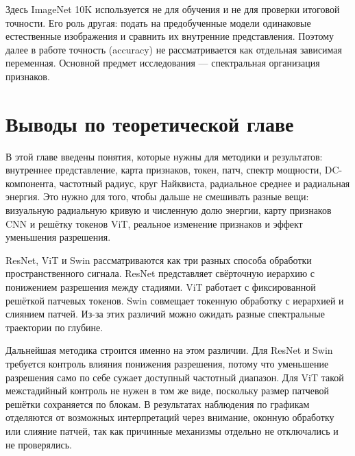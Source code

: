 Здесь ImageNet 10K используется не для обучения и не для проверки итоговой точности. Его роль другая: подать на предобученные модели одинаковые естественные изображения и сравнить их внутренние представления. Поэтому далее в работе точность (accuracy) не рассматривается как отдельная зависимая переменная. Основной предмет исследования — спектральная организация признаков.

\section{Выводы по теоретической главе}

В этой главе введены понятия, которые нужны для методики и результатов: внутреннее представление, карта признаков, токен, патч, спектр мощности, DC-компонента, частотный радиус, круг Найквиста, радиальное среднее и радиальная энергия. Это нужно для того, чтобы дальше не смешивать разные вещи: визуальную радиальную кривую и численную долю энергии, карту признаков CNN и решётку токенов ViT, реальное изменение признаков и эффект уменьшения разрешения.

ResNet, ViT и Swin рассматриваются как три разных способа обработки пространственного сигнала. ResNet представляет свёрточную иерархию с понижением разрешения между стадиями. ViT работает с фиксированной решёткой патчевых токенов. Swin совмещает токенную обработку с иерархией и слиянием патчей. Из-за этих различий можно ожидать разные спектральные траектории по глубине.

Дальнейшая методика строится именно на этом различии. Для ResNet и Swin требуется контроль влияния понижения разрешения, потому что уменьшение разрешения само по себе сужает доступный частотный диапазон. Для ViT такой межстадийный контроль не нужен в том же виде, поскольку размер патчевой решётки сохраняется по блокам. В результатах наблюдения по графикам отделяются от возможных интерпретаций через внимание, оконную обработку или слияние патчей, так как причинные механизмы отдельно не отключались и не проверялись.
